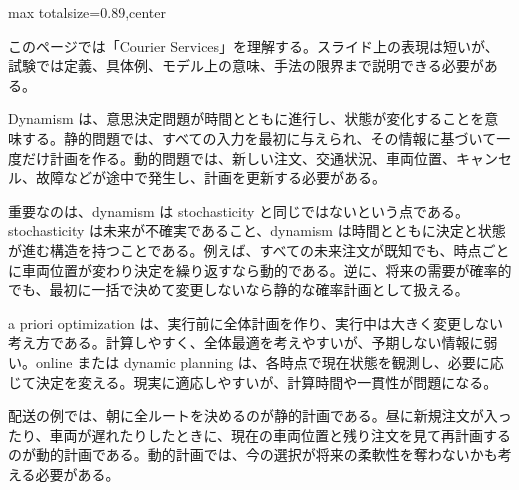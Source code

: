 \begin{minipage}[t]{0.58\textwidth}
\begin{adjustbox}{max totalsize={\textwidth}{0.89\textheight},center}
\begin{minipage}{\textwidth}\scriptsize
{}このページでは「Courier Services」を理解する。スライド上の表現は短いが、試験では定義、具体例、モデル上の意味、手法の限界まで説明できる必要がある。\par
Dynamism は、意思決定問題が時間とともに進行し、状態が変化することを意味する。静的問題では、すべての入力を最初に与えられ、その情報に基づいて一度だけ計画を作る。動的問題では、新しい注文、交通状況、車両位置、キャンセル、故障などが途中で発生し、計画を更新する必要がある。\par
重要なのは、dynamism は stochasticity と同じではないという点である。stochasticity は未来が不確実であること、dynamism は時間とともに決定と状態が進む構造を持つことである。例えば、すべての未来注文が既知でも、時点ごとに車両位置が変わり決定を繰り返すなら動的である。逆に、将来の需要が確率的でも、最初に一括で決めて変更しないなら静的な確率計画として扱える。\par
a priori optimization は、実行前に全体計画を作り、実行中は大きく変更しない考え方である。計算しやすく、全体最適を考えやすいが、予期しない情報に弱い。online または dynamic planning は、各時点で現在状態を観測し、必要に応じて決定を変える。現実に適応しやすいが、計算時間や一貫性が問題になる。\par
配送の例では、朝に全ルートを決めるのが静的計画である。昼に新規注文が入ったり、車両が遅れたりしたときに、現在の車両位置と残り注文を見て再計画するのが動的計画である。動的計画では、今の選択が将来の柔軟性を奪わないかも考える必要がある。\par

\end{minipage}
\end{adjustbox}
\end{minipage}
